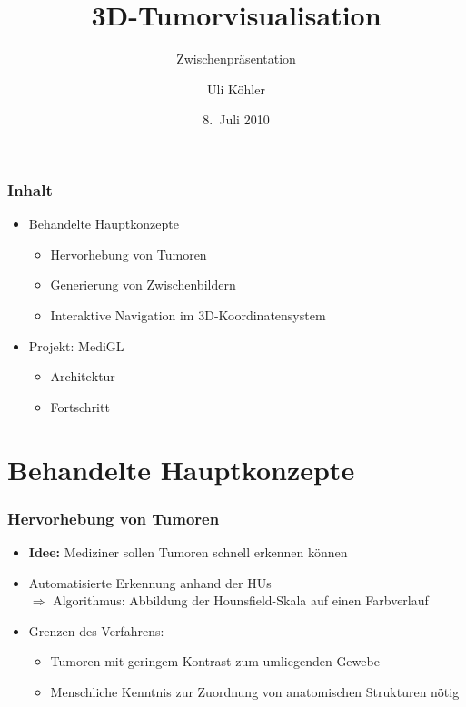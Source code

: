 \documentclass[14pt]{beamer}
\title{3D-Tumorvisualisation}
\subtitle{Zwischenpräsentation}
\author{Uli Köhler}
\institute[EMG]{Ernst-Mach-Gymnasium Haar}
\date{8.~Juli 2010}
\begin{document}
\frame{\titlepage}
\begin{frame}
   \frametitle{Inhalt}
   \begin{itemize}
    \item  Behandelte Hauptkonzepte
    \begin{itemize}
      \item Hervorhebung von Tumoren
      \item Generierung von Zwischenbildern
      \item Interaktive Navigation im 3D-Koordinatensystem
    \end{itemize}
    \pause
    \item Projekt: MediGL
    \begin{itemize}
     \item Architektur
     \item Fortschritt
    \end{itemize}
   \end{itemize}
\end{frame}
  \section{Behandelte Hauptkonzepte}
\begin{frame}[allowframebreaks]
 \frametitle{Hervorhebung von Tumoren}
    \begin{itemize}
     \item \textbf{Idee:} Mediziner sollen Tumoren schnell erkennen können
     \item Automatisierte Erkennung anhand der HUs\\
	  $\Rightarrow$ Algorithmus: Abbildung der Hounsfield-Skala auf einen Farbverlauf
     \item Grenzen des Verfahrens:
      \begin{itemize}
	\item Tumoren mit geringem Kontrast zum umliegenden Gewebe
	\item Menschliche Kenntnis zur Zuordnung von anatomischen Strukturen nötig
      \end{itemize}
    \end{itemize}

\end{frame}
\end{document}
